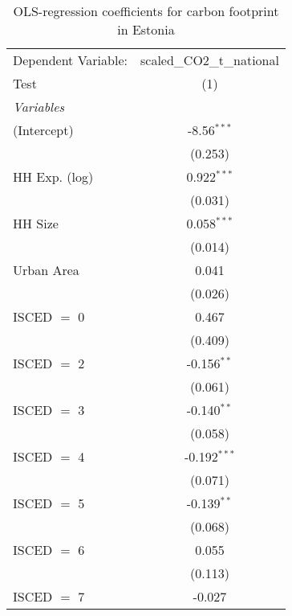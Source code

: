 
\begin{table}[htbp!]
   \centering
   \small
   \begin{adjustbox}{width = 1\textwidth, max height = 0.95\textheight, center}
      \begin{threeparttable}[b]
         \caption{\label{tab:OLS_2_EST} OLS-regression coefficients for carbon footprint in Estonia}
         \begin{tabular}{lc}
            \tabularnewline \midrule \midrule
            Dependent Variable: & scaled\_CO2\_t\_national\\     
            Test                & (1)\\  
            \midrule
            \emph{Variables}\\
            (Intercept)         & -8.56$^{***}$\\   
                                & (0.253)\\   
            HH Exp. (log)       & 0.922$^{***}$\\   
                                & (0.031)\\   
            HH Size             & 0.058$^{***}$\\   
                                & (0.014)\\   
            Urban Area          & 0.041\\   
                                & (0.026)\\   
            ISCED $=$ 0         & 0.467\\   
                                & (0.409)\\   
            ISCED $=$ 2         & -0.156$^{**}$\\   
                                & (0.061)\\   
            ISCED $=$ 3         & -0.140$^{**}$\\   
                                & (0.058)\\   
            ISCED $=$ 4         & -0.192$^{***}$\\   
                                & (0.071)\\   
            ISCED $=$ 5         & -0.139$^{**}$\\   
                                & (0.068)\\   
            ISCED $=$ 6         & 0.055\\   
                                & (0.113)\\   
            ISCED $=$ 7         & -0.027\\   

\end{tabular}
\end{threeparttable}
\end{adjustbox}
\end{table}
